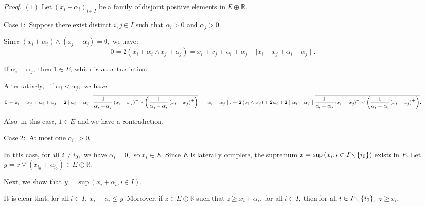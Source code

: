 \documentclass{birkau}
\numberwithin{equation}{section}
\theoremstyle{plain}
\theoremstyle{definition}
\begin{document}
\begin{proof}
	$\left( 1\right) $ Let $\left( x_{i}+\alpha _{i}\right) _{i\in I}$ be a
	family of disjoint positive elements in $E\oplus 
	\mathbb{R}
	$.
	
	Case $1:$ Suppose there exist distinct $i,j\in I$ such that $\alpha _{i}>0$
	and $\alpha _{j}>0.$
	
	Since $\left( x_{i}+\alpha _{i}\right) \wedge \left( x_{j}+\alpha
	_{j}\right) =0,$ we have: 
	\begin{equation*}
		0=2\left( x_{i}+\alpha _{i}\wedge x_{j}+\alpha _{j}\right)
		=x_{i}+x_{j}+\alpha _{i}+\alpha _{j}-\mid x_{i}-x_{j}+\alpha _{i}-\alpha
		_{j}\mid .
	\end{equation*}
	
	If $\alpha _{i}=\alpha _{j},$ then $1\in E$,  which is a contradiction.
	
	
	Alternatively,  \ if $\alpha _{i}<\alpha _{j},$ we have%
	\begin{equation*}
		0 =x_{i}+x_{j}+\alpha _{i}+\alpha _{j}+2\mid \alpha _{i}-\alpha _{j}\mid 
		\overline{\frac{1}{\alpha _{i}-\alpha _{j}}\left( x_{i}-x_{j}\right)
			^{-}\vee \left( \frac{1}{\alpha _{j}-\alpha _{i}}\left( x_{i}-x_{j}\right)
			^{+}\right) }-\mid \alpha _{i}-\alpha _{j}\mid . \\
		=2\left( x_{i}\wedge x_{j}\right) +2\alpha _{i}+2\mid \alpha _{i}-\alpha
		_{j}\mid \overline{\frac{1}{\alpha _{i}-\alpha _{j}}\left(
			x_{i}-x_{j}\right) ^{-}\vee \left( \frac{1}{\alpha _{j}-\alpha _{i}}\left(
			x_{i}-x_{j}\right) ^{+}\right) }.
	\end{equation*}
	
	Also,  in this case, $1\in E$ and we have a contradiction.
	
	Case $2:$ At most one $\alpha _{i_{0}}>0.$
	
	In this case, for all $i\neq i_{0},$ we have $\alpha _{i}=0,$ so $x_{i}\in E.
	$ Since $E$ is laterally complete,  the supremum $x=\sup \left( x_{i},i\in
	I\diagdown \left\{ i_{0}\right\} \right) $ exists in $E.$ Let $y=x\vee
	\left( x_{i_{0}}+\alpha _{i_{0}}\right) \in E\oplus 
	\mathbb{R}
	.$
	
	Next,  we show that $y=\sup \left( x_{i}+\alpha _{i},i\in I\right) .$
	
	It is clear that,  for all $i\in I,$ $x_{i}+\alpha _{i}\leq y.$ Moreover,  if $%
	z\in E\oplus 
	\mathbb{R}
	$ such that $z\geq x_{i}+\alpha _{i},$ for all $i\in I,$ then for all $i\in
	I\diagdown \left\{ i_{0}\right\} ,$ $z\geq x_{i}.$
	

\end{proof}
\end{document}
